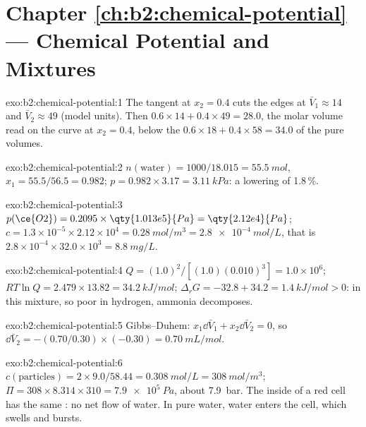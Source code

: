 \section*{Chapter \ref{ch:b2:chemical-potential} --- Chemical Potential and Mixtures}

\begin{solution}{exo:b2:chemical-potential:1}
The tangent at $x_2 = 0.4$ cuts the edges at $\bar V_1 \approx 14$ and $\bar
V_2 \approx 49$ (model units). Then $0.6 \times 14 + 0.4 \times 49 = 28.0$,
the molar volume read on the curve at $x_2 = 0.4$, below the
$0.6 \times 18 + 0.4 \times 58 = 34.0$ of the pure volumes.
\end{solution}

\begin{solution}{exo:b2:chemical-potential:2}
$n(\text{water}) = 1000/18.015 = \qty{55.5}{mol}$, $x_1 = 55.5/56.5 = 0.982$;
$p = 0.982 \times 3.17 = \qty{3.11}{kPa}$: a lowering of 1.8\,\%.
\end{solution}

\begin{solution}{exo:b2:chemical-potential:3}
$p(\ce{O2}) = 0.2095 \times \qty{1.013e5}{Pa} = \qty{2.12e4}{Pa}$;
$c = 1.3 \times 10^{-5} \times 2.12 \times 10^4 = \qty{0.28}{mol/m^3} =
\qty{2.8e-4}{mol/L}$, that is $2.8 \times 10^{-4} \times 32.0 \times 10^3 =
\qty{8.8}{mg/L}$.
\end{solution}

\begin{solution}{exo:b2:chemical-potential:4}
$Q = (1.0)^2/[(1.0)(0.010)^3] = 1.0 \times 10^6$; $RT\ln Q = 2.479 \times 13.82 =
\qty{34.2}{kJ/mol}$; $\Delta_r G = -32.8 + 34.2 = \qty{+1.4}{kJ/mol} > 0$: in this
mixture, so poor in hydrogen, ammonia decomposes.
\end{solution}

\begin{solution}{exo:b2:chemical-potential:5}
Gibbs--Duhem: $x_1\dd\bar V_1 + x_2\dd\bar V_2 = 0$, so $\dd\bar V_2 =
-(0.70/0.30) \times (-0.30) = \qty{+0.70}{mL/mol}$.
\end{solution}

\begin{solution}{exo:b2:chemical-potential:6}
$c(\text{particles}) = 2 \times 9.0/58.44 = \qty{0.308}{mol/L} =
\qty{308}{mol/m^3}$; $\Pi = 308 \times 8.314 \times 310 = \qty{7.9e5}{Pa}$,
about \qty{7.9}{bar}. The inside of a red cell has the same :
no net flow of water. In pure water, water enters the cell, which swells and
bursts.
\end{solution}

